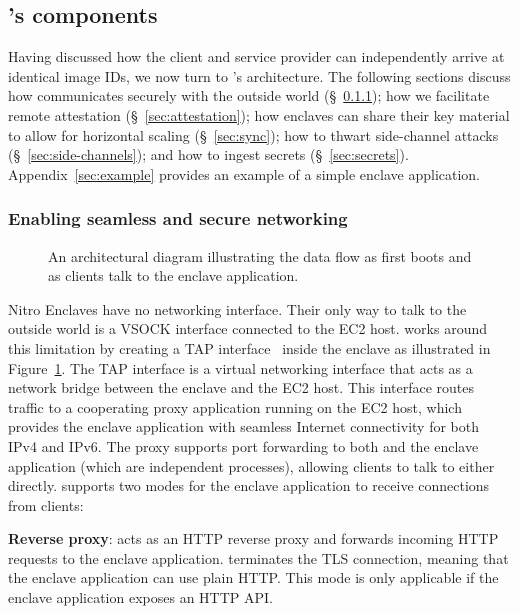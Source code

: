 \subsection{\Tool{}'s components}%
\label{sec:framework}

Having discussed how the client and service provider can independently arrive at
identical image IDs, we now turn to \tool{}'s architecture.  The
following sections discuss how \tool{}
communicates securely with the outside world (\S~\ref{sec:networking});
how we facilitate remote attestation (\S~\ref{sec:attestation});
how enclaves can share their key material to allow for horizontal scaling (\S~\ref{sec:sync});
how to thwart side-channel attacks (\S~\ref{sec:side-channels}); and
how to ingest secrets (\S~\ref{sec:secrets}).
Appendix~\ref{sec:example} provides an example of a simple enclave application.

\subsubsection{Enabling seamless and secure networking}%
\label{sec:networking}

\begin{figure}[t]
  \centering
  
  \caption{An architectural diagram illustrating the data flow as \tool{} first
    boots and as clients talk to the enclave application.}%
  \label{fig:networking}
\end{figure}

Nitro Enclaves have no networking interface.  Their only way to talk to the
outside world is a VSOCK interface connected to the EC2 host.  \Tool{}
works around this limitation by creating a TAP interface~\cite{tun-tap} inside
the enclave as illustrated in Figure~\ref{fig:networking}.  The TAP interface is
a virtual networking interface that acts as a network bridge between the enclave
and the EC2 host.  This interface routes traffic to a cooperating proxy
application running on the EC2 host, which provides the enclave application with
seamless Internet connectivity for both IPv4 and IPv6.  The proxy supports port
forwarding to both \tool{} and the enclave application (which are independent
processes), allowing clients to talk to either directly.  \Tool{} supports two
modes for the enclave application to receive connections from clients:

{\bf Reverse proxy}: \Tool{} acts as an HTTP reverse proxy and forwards incoming
HTTP requests to the enclave application.  \Tool{} terminates the TLS
connection, meaning that the enclave application can use plain HTTP.  This mode
is only applicable if the enclave application exposes an HTTP API.

